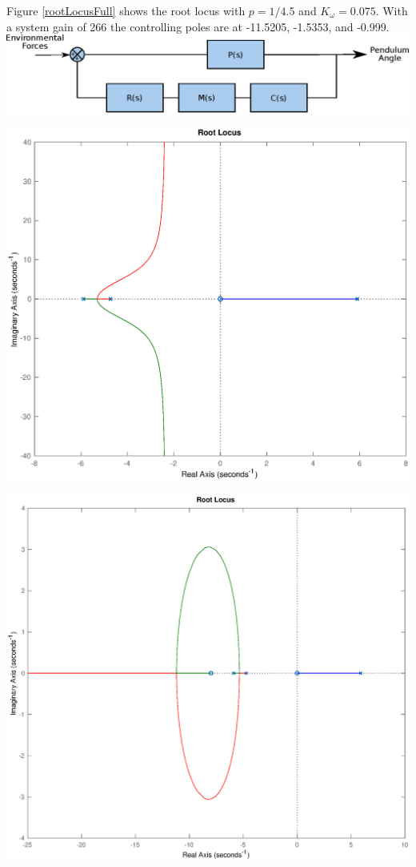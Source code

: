 \documentclass[12pt,letterpaper]{article}
\begin{document}
Figure \ref{rootLocusFull} shows the root locus with $p = 1/4.5$ and $K_{\omega} = 0.075$.  With a system gain of 266 the controlling poles are at -11.5205, -1.5353, and -0.999.\\

\includegraphics[width=\textwidth]{images/transferFunction.eps}
    \label{transferFunction}

\includegraphics[width=\textwidth]{images/rootLocus.eps} 
    \label{rootLocus}

\includegraphics[width=\textwidth]{images/rootLocusPD.eps} 
    \label{rootLocusPD}
\end{document}
